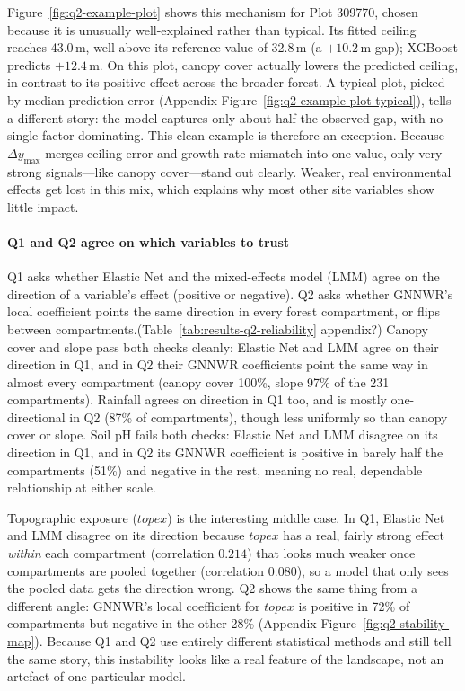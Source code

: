 \documentclass[logo,msc,ai]{infthesis}           %
\begin{document}
Figure~\ref{fig:q2-example-plot} shows this mechanism for Plot 309770, chosen because it is unusually well-explained rather than typical. Its fitted ceiling reaches 43.0\,m, well above its reference value of 32.8\,m (a $+10.2$\,m gap); XGBoost predicts $+12.4$\,m. On this plot, canopy cover actually lowers the predicted ceiling, in contrast to its positive effect across the broader forest. A typical plot, picked by median prediction error (Appendix Figure~\ref{fig:q2-example-plot-typical}), tells a different story: the model captures only about half the observed gap, with no single factor dominating. This clean example is therefore an exception. Because $\Delta y_{\max}$ merges ceiling error and growth-rate mismatch into one value, only very strong signals—like canopy cover—stand out clearly. Weaker, real environmental effects get lost in this mix, which explains why most other site variables show little impact.

\paragraph*{Q1 and Q2 agree on which variables to trust}
Q1 asks whether Elastic Net and the mixed-effects model (LMM) agree on the direction of a variable's effect (positive or negative). Q2 asks whether GNNWR's local coefficient points the same direction in every forest compartment, or flips between compartments.(Table~\ref{tab:results-q2-reliability} appendix?) Canopy cover and slope pass both checks cleanly: Elastic Net and LMM agree on their direction in Q1, and in Q2 their GNNWR coefficients point the same way in almost every compartment (canopy cover 100\%, slope 97\% of the 231 compartments). Rainfall agrees on direction in Q1 too, and is mostly one-directional in Q2 (87\% of compartments), though less uniformly so than canopy cover or slope. Soil pH fails both checks: Elastic Net and LMM disagree on its direction in Q1, and in Q2 its GNNWR coefficient is positive in barely half the compartments (51\%) and negative in the rest, meaning no real, dependable relationship at either scale.
 
Topographic exposure ($\mathit{topex}$) is the interesting middle case. In Q1, Elastic Net and LMM disagree on its direction because $\mathit{topex}$ has a real, fairly strong effect \emph{within} each compartment (correlation $0.214$) that looks much weaker once compartments are pooled together (correlation $0.080$), so a model that only sees the pooled data gets the direction wrong. Q2 shows the same thing from a different angle: GNNWR's local coefficient for $\mathit{topex}$ is positive in 72\% of compartments but negative in the other 28\% (Appendix Figure~\ref{fig:q2-stability-map}). Because Q1 and Q2 use entirely different statistical methods and still tell the same story, this instability looks like a real feature of the landscape, not an artefact of one particular model.
\end{document}
